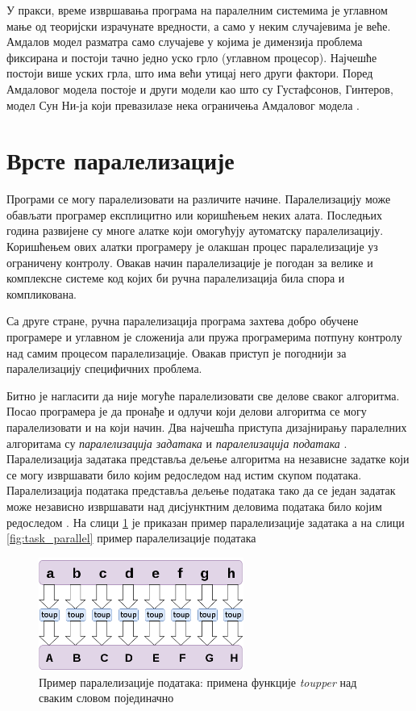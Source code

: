 \documentclass[12pt,oneside]{memoir}
\begin{document}
 У пракси, време извршавања програма на паралелним системима је углавном мање од теоријски израчунате вредности, а само у неким случајевима је веће. Амдалов модел разматра само случајеве у којима је димензија проблема фиксирана и постоји тачно једно уско грло (углавном процесор). Најчешће постоји више уских грла, што има већи утицај него други фактори. Поред Амдаловог модела постоје и други модели као што су Густафсонов, Гинтеров, модел Сун Ни-ја који превазилазе нека ограничења Амдаловог модела \cite{performance}.
 	 


  \section{Врсте паралелизације}
  
 Програми се могу паралелизовати на различите начине. Паралелизацију може обављати програмер експлицитно или коришћењем неких алата. Последњих година развијене су многе алатке који омогућују аутоматску паралелизацију. Коришћењем ових алатки програмеру је олакшан процес паралелизације уз ограничену контролу. Овакав начин паралелизације је погодан за велике и комплексне системе код којих би ручна паралелизација била спора и компликована.
 
  Са друге стране, ручна паралелизација програма захтева добро обучене програмере и углавном је сложенија али пружа програмерима потпуну контролу над самим процесом паралелизације. Овакав приступ је погоднији за паралелизацију специфичних проблема.


  Битно је нагласити да није могуће паралелизовати све делове сваког алгоритма. Посао програмера је да пронађе и одлучи који делови алгоритма се могу паралелизовати и на који начин.
 Два најчешћа приступа дизајнирању паралелних алгоритама су \textit{паралелизација задатака} и \textit{паралелизација података} \cite{art_conc}. 
Паралелизација задатака представља дељење алгоритма на независне задатке који се могу извршавати било којим редоследом над истим скупом података.
Паралелизација података представља дељење података тако да се један задатак може независно извршавати над дисјунктним деловима података било којим редоследом \cite{art_conc}. 
На слици  \ref{fig:data_parallel} је приказан пример паралелизације задатака а на слици \ref{fig:task_parallel} пример паралелизације података

\begin{figure}[!ht]
  \centering
  \includegraphics[width=0.6\textwidth]{img/data_parallel.png}
  \caption{Пример паралелизације података: примена функције \textit{toupper} над сваким словом појединачно}
  \label{fig:data_parallel}
\end{figure}
\end{document}
